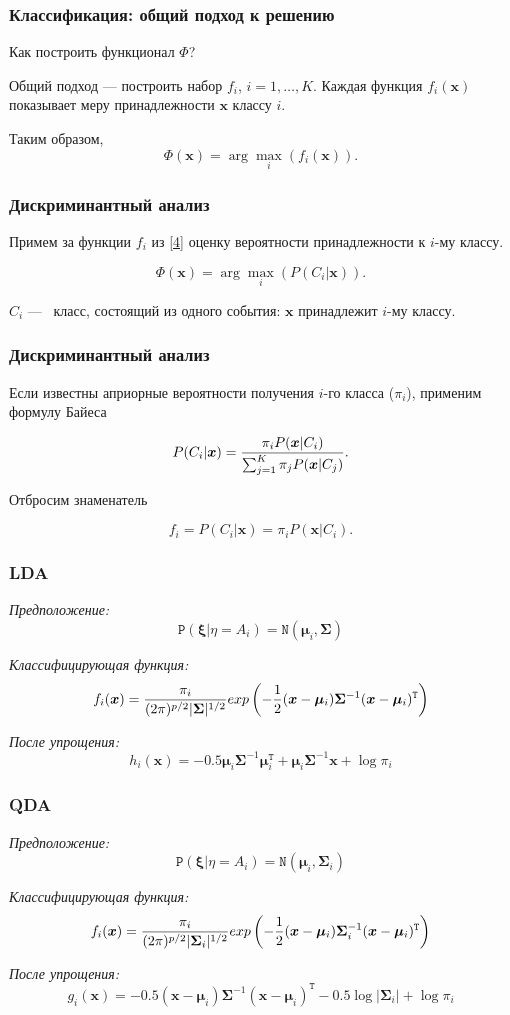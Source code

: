 \documentclass[11pt]{beamer}
\begin{document}
	\begin{frame}
		\frametitle{Классификация: общий подход к решению}
		Как построить функционал $\Phi$?
		
		
		Общий подход --- построить набор $f_i$, $i = 1, \ldots, K$. Каждая функция $f_i(\bm{x})$ показывает меру принадлежности $\bm{x}$ классу $i$. 
		
		Таким образом,
		\begin{equation}
			\Phi(\bm{x}) = \arg\max_i(f_i(\bm{x})).
			\label{4}
		\end{equation}
	\end{frame}
	\begin{frame}
		\frametitle{Дискриминантный анализ}
		Примем за функции $f_i$ из \ref{4} оценку вероятности принадлежности к $i$-му классу.
		
		$$\Phi(\bm{x}) = \arg\max_i (P(C_i|\bm{x})).$$
		
		$C_i$ ---  класс, состоящий из одного события: $\bm{x}$ принадлежит $i$-му классу.
	\end{frame}
	\begin{frame}
		\frametitle{Дискриминантный анализ}
		Если известны априорные вероятности получения $i$-го класса ($\pi_i$), применим формулу Байеса
		
		$$P(C_i|\bm{x}) = {{\pi_i P(\bm{x}|C_i)}\over{\sum_{j=1}^{K} \pi_j P(\bm{x}|C_j)}}.$$
		 
		 Отбросим знаменатель
		
		$$f_i = P(C_i|\bm{x}) = \pi_i P(\bm{x}|C_i).$$
	\end{frame}
	\begin{frame}
		\frametitle{LDA}
		\textit{Предположение:}	
		$$\mathtt{P}(\bm{\xi}|\eta = A_i) = \mathtt{N}(\bm{\mu}_i, \bm{\Sigma})$$
		
		\textit{Классифицирующая функция:}
		$$f_i(\bm{x}) = {{\pi_i}\over{(2\pi)^{p/2}|\bm{\Sigma}|^{1/2}}}exp\left(-{{1}\over{2}}(\bm{x} - \bm{\mu}_i)\bm{\Sigma}^{-1}(\bm{x} - \bm{\mu}_i)^\mathtt{T}\right)$$
		
		\textit{После упрощения:}
		$$h_i(\bm{x}) = -0.5 \bm{\mu}_i\bm{\Sigma}^{-1}\bm{\mu}_i^\mathtt{T} + \bm{\mu}_i\bm{\Sigma}^{-1}\bm{x} + \log\pi_i$$

	\end{frame}

	\begin{frame}
		\frametitle{QDA}
		\textit{Предположение:}	
		$$\mathtt{P}(\bm{\xi}|\eta = A_i) = \mathtt{N}(\bm{\mu}_i, \bm{\Sigma}_i)$$
		
		\textit{Классифицирующая функция:}
		$$f_i(\bm{x}) = {{\pi_i}\over{(2\pi)^{p/2}|\bm{\Sigma}_i|^{1/2}}}exp\left(-{{1}\over{2}}(\bm{x} - \bm{\mu}_i)\bm{\Sigma}_i^{-1}(\bm{x} - \bm{\mu}_i)^\mathtt{T}\right)$$
		
		\textit{После упрощения:}
		$$g_i(\bm{x}) = -0.5 (\bm{x} - \bm{\mu}_i)\bm{\Sigma}^{-1}(\bm{x} - \bm{\mu}_i)^\mathtt{T} - 0.5\log|\bm{\Sigma}_i| + \log\pi_i$$
		
	\end{frame}
\end{document}
